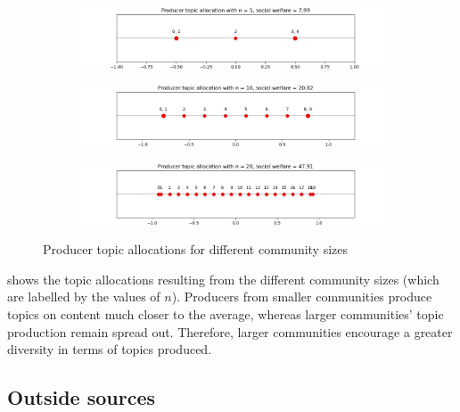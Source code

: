 \documentclass[11pt, letterpaper]{article}
\begin{document}
\begin{figure}[h]
    \centering
    \begin{subfigure}[b]{0.6\textwidth}
        \includegraphics[width=\linewidth]{figures/n/5_topics.jpg}
    \end{subfigure}
    \begin{subfigure}[b]{0.6\textwidth}
        \includegraphics[width=\linewidth]{figures/n/10_topics.jpg}
    \end{subfigure}
    \begin{subfigure}[b]{0.6\textwidth}
        \includegraphics[width=\linewidth]{figures/n/20_topics.jpg}
    \end{subfigure}
\caption{Producer topic allocations for different community sizes}
\label{fig:num_members_topics}
\end{figure}

 shows the topic allocations resulting from the different community sizes (which are labelled by the values of \(n\)). Producers from smaller communities produce topics on content much closer to the average, whereas larger communities' topic production remain spread out. Therefore, larger communities encourage a greater diversity in terms of topics produced.

\subsection{Outside sources}
\end{document}
